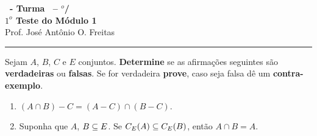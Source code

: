 \documentclass[12pt]{exam}
\begin{document}
    \begin{center}
        {\Large\bf \disciplina\ - Turma \turma\ -- \semestre$^{o}$/\ano} \\ \vspace{9pt} {\large\bf
        $1^o$ Teste do M\'odulo 1}\\
        \vspace{9pt} Prof. Jos{\'e} Ant{\^o}nio O. Freitas
    \end{center}
    \hrule

    \vspace{1cm}

    Sejam $A$, $B$, $C$ e $E$ conjuntos. \textbf{Determine} se as afirma\c{c}\~oes seguintes s\~ao \textbf{verdadeiras} ou \textbf{falsas}. Se for verdadeira \textbf{prove}, caso seja falsa d\^e um \textbf{contra-exemplo}.
\begin{enumerate}[label={\alph*})]
    \item $(A \cap B) - C = (A - C) \cap (B - C)$.
    \item Suponha que $A$, $B \subseteq E$. Se $C_E(A) \subseteq C_E(B)$, ent\~ao $A \cap B = A$.
\end{enumerate}
\end{document}
